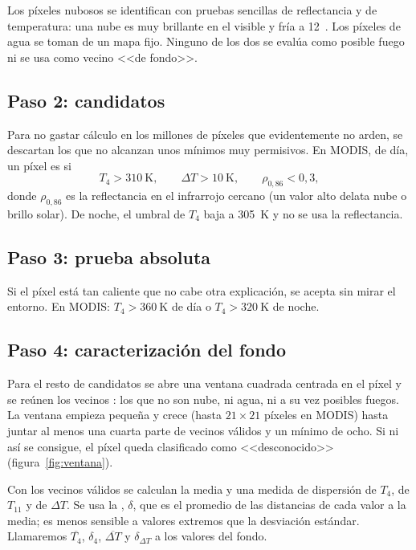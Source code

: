 Los píxeles nubosos se identifican con pruebas sencillas de reflectancia y de temperatura: una
nube es muy brillante en el visible y fría a 12~\um. Los píxeles de agua se toman de un mapa
fijo. Ninguno de los dos se evalúa como posible fuego ni se usa como vecino <<de fondo>>.

\subsection{Paso 2: candidatos}

Para no gastar cálculo en los millones de píxeles que evidentemente no arden, se descartan los
que no alcanzan unos mínimos muy permisivos. En MODIS, de día, un píxel es
 si
\begin{equation}
  T_4 > \SI{310}{\kelvin}, \qquad \Delta T > \SI{10}{\kelvin}, \qquad \rho_{0{,}86} < 0{,}3,
\end{equation}
donde $\rho_{0{,}86}$ es la reflectancia en el infrarrojo cercano (un valor alto delata nube o
brillo solar). De noche, el umbral de $T_4$ baja a 305~K y no se usa la reflectancia.

\subsection{Paso 3: prueba absoluta}

Si el píxel está tan caliente que no cabe otra explicación, se acepta sin mirar el entorno. En
MODIS: $T_4 > \SI{360}{\kelvin}$ de día o $T_4 > \SI{320}{\kelvin}$ de noche.

\subsection{Paso 4: caracterización del fondo}

Para el resto de candidatos se abre una ventana cuadrada centrada en el píxel y se reúnen los
vecinos : los que no son nube, ni agua, ni a su vez posibles fuegos. La ventana
empieza pequeña y crece (hasta $21\times21$ píxeles en MODIS) hasta juntar al menos una cuarta
parte de vecinos válidos y un mínimo de ocho. Si ni así se consigue, el píxel queda clasificado
como <<desconocido>> (figura~\ref{fig:ventana}).

Con los vecinos válidos se calculan la media y una medida de dispersión de $T_4$, de $T_{11}$ y
de $\Delta T$. Se usa la , $\delta$, que es el promedio de
las distancias de cada valor a la media; es menos sensible a valores extremos que la desviación
estándar. Llamaremos $\overline{T_4}$, $\delta_4$, $\overline{\Delta T}$ y $\delta_{\Delta T}$ a
los valores del fondo.

